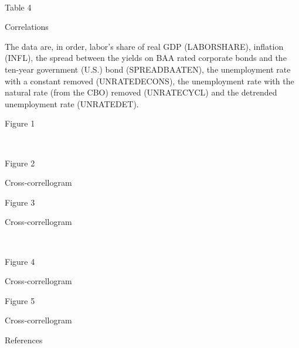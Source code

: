 \documentclass{article}
\begin{document}
\begin{center}
\ \bigskip

{\Large Table 4}

\bigskip

{\large Correlations\medskip }

The data are, in order, labor's share of real GDP (LABORSHARE), inflation
(INFL), the spread between the yields on BAA rated corporate bonds and the
ten-year government (U.S.) bond (SPREADBAATEN), the unemployment rate with a
constant removed (UNRATEDECONS), the unemployment rate with the natural rate
(from the CBO) removed (UNRATECYCL) and the detrended unemployment rate
(UNRATEDET).

\bigskip

{\Large Figure 1}\bigskip

\ \bigskip

{\Large Figure 2}

\bigskip

{\large Cross-correllogram}

\bigskip

\bigskip

{\Large Figure 3}\bigskip

{\large Cross-correllogram}

\ \bigskip

{\Large Figure 4}

\bigskip

{\large Cross-correllogram}

\bigskip

\bigskip

{\Large Figure 5}

\bigskip

{\large Cross-correllogram}
\end{center}

{\Large References}
\end{document}

